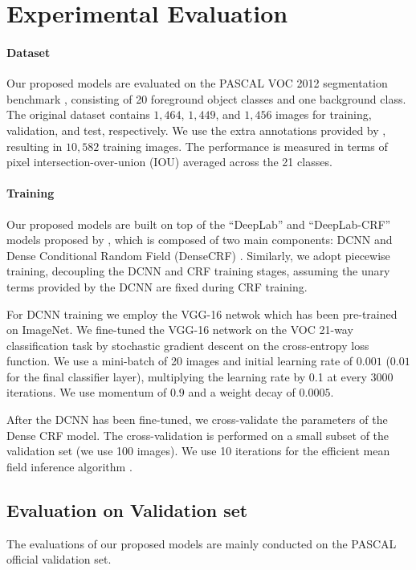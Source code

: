 \section{Experimental Evaluation}
\paragraph{Dataset} Our proposed models are evaluated on the PASCAL VOC 2012 segmentation benchmark \citep{everingham2014pascal}, consisting of 20 foreground object classes and one background class. The original dataset contains $1,464$, $1,449$, and $1,456$ images for training, validation, and test, respectively. We use the extra annotations provided by \citet{hariharan2011semantic}, resulting in $10,582$ training images. The performance is measured in terms of pixel intersection-over-union (IOU) averaged across the 21 classes. 

\paragraph{Training} Our proposed models are built on top of the ``DeepLab'' and ``DeepLab-CRF'' models proposed by \citep{chen2014semantic}, which is composed of two main components: DCNN and Dense Conditional Random Field (DenseCRF) \citep{krahenbuhl2011efficient}. Similarly, we adopt piecewise training, decoupling the DCNN and CRF training stages, assuming the unary terms provided by the DCNN are fixed during CRF training. 

For DCNN training we employ the VGG-16 netwok which has been pre-trained on ImageNet. We fine-tuned the VGG-16 network on the VOC 21-way classification task by stochastic gradient descent on the cross-entropy loss function. We use a mini-batch of 20 images and initial learning rate of $0.001$ ($0.01$ for the final classifier layer), multiplying the learning rate by 0.1 at every 3000 iterations. We use momentum of $0.9$ and a weight decay of $0.0005$.

After the DCNN has been fine-tuned, we cross-validate the parameters of the Dense CRF model. The cross-validation is performed on a small subset of the validation set (we use 100 images). We use 10 iterations for the efficient mean field inference algorithm \citep{krahenbuhl2011efficient}. 

\subsection{Evaluation on Validation set}
The evaluations of our proposed models are mainly conducted on the PASCAL official validation set. 

